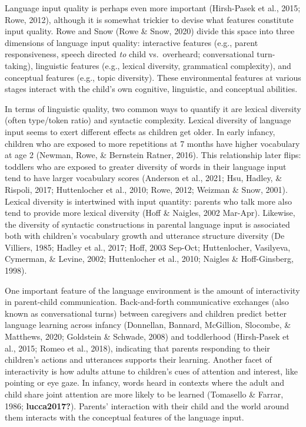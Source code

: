\documentclass[
  man]{apa6}
\begin{document}
Language input quality is perhaps even more important (Hirsh-Pasek et al., 2015; Rowe, 2012), although it is somewhat trickier to devise what features constitute input quality. Rowe and Snow (Rowe \& Snow, 2020) divide this space into three dimensions of language input quality: interactive features (e.g., parent responsiveness, speech directed \emph{to} child vs.~overheard; conversational turn-taking), linguistic features (e.g., lexical diversity, grammatical complexity), and conceptual features (e.g., topic diversity). These environmental features at various stages interact with the child's own cognitive, linguistic, and conceptual abilities.

In terms of linguistic quality, two common ways to quantify it are lexical diversity (often type/token ratio) and syntactic complexity. Lexical diversity of language input seems to exert different effects as children get older. In early infancy, children who are exposed to more repetitions at 7 months have higher vocabulary at age 2 (Newman, Rowe, \& Bernstein Ratner, 2016). This relationship later flips: toddlers who are exposed to greater diversity of words in their language input tend to have larger vocabulary scores (Anderson et al., 2021; Hsu, Hadley, \& Rispoli, 2017; Huttenlocher et al., 2010; Rowe, 2012; Weizman \& Snow, 2001). Lexical diversity is intertwined with input quantity: parents who talk more also tend to provide more lexical diversity (Hoff \& Naigles, 2002 Mar-Apr). Likewise, the diversity of syntactic constructions in parental language input is associated both with children's vocabulary growth and utterance structure diversity (De Villiers, 1985; Hadley et al., 2017; Hoff, 2003 Sep-Oct; Huttenlocher, Vasilyeva, Cymerman, \& Levine, 2002; Huttenlocher et al., 2010; Naigles \& Hoff-Ginsberg, 1998).

One important feature of the language environment is the amount of interactivity in parent-child communication. Back-and-forth communicative exchanges (also known as conversational turns) between caregivers and children predict better language learning across infancy (Donnellan, Bannard, McGillion, Slocombe, \& Matthews, 2020; Goldstein \& Schwade, 2008) and toddlerhood (Hirsh-Pasek et al., 2015; Romeo et al., 2018), indicating that parents responding to their children's actions and utterances supports their learning. Another facet of interactivity is how adults attune to children's cues of attention and interest, like pointing or eye gaze. In infancy, words heard in contexts where the adult and child share joint attention are more likely to be learned (Tomasello \& Farrar, 1986; \textbf{lucca2017?}). Parents' interaction with their child and the world around them interacts with the conceptual features of the language input.
\end{document}
